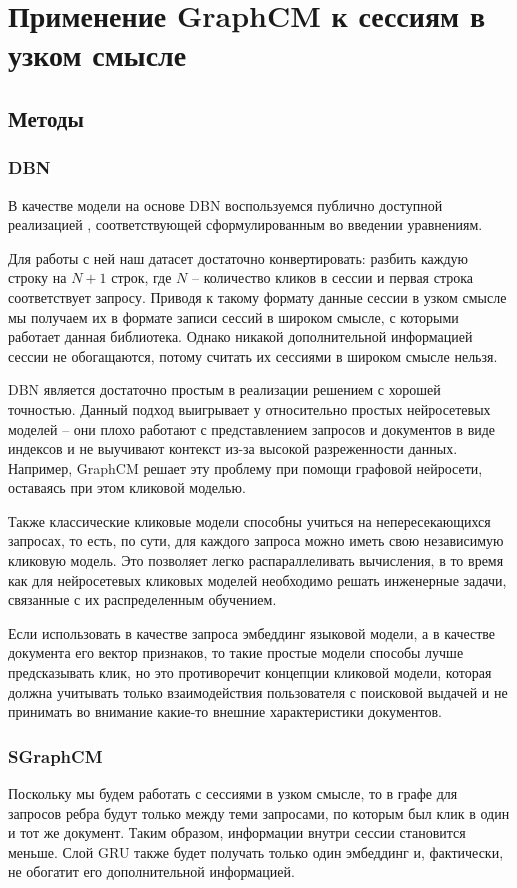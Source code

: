 \documentclass[diploma]{nanolab2015}
\begin{document}
\section{Применение GraphCM к сессиям в узком смысле}
\subsection{Методы}
\subsubsection{DBN}
В качестве модели на основе DBN воспользуемся публично доступной реализацией \cite{dbngithub}, соответствующей сформулированным во введении уравнениям.

Для работы с ней наш датасет достаточно конвертировать: разбить каждую строку на $N+1$ строк, где $N$ -- количество кликов в сессии и первая строка соответствует запросу. Приводя к такому формату данные сессии в узком смысле мы получаем их в формате записи сессий в широком смысле, с которыми работает данная библиотека. Однако никакой дополнительной информацией сессии не обогащаются, потому считать их сессиями в широком смысле нельзя.

DBN является достаточно простым в реализации решением с хорошей точностью. Данный подход выигрывает у относительно простых нейросетевых моделей -- они плохо работают с представлением запросов и документов в виде индексов и не выучивают контекст из-за высокой разреженности данных. Например, GraphCM решает эту проблему при помощи графовой нейросети, оставаясь при этом кликовой моделью.

Также классические кликовые модели способны учиться на непересекающихся запросах, то есть, по сути, для каждого запроса можно иметь свою независимую кликовую модель. Это позволяет легко распараллеливать вычисления, в то время как для нейросетевых кликовых моделей необходимо решать инженерные задачи, связанные с их распределенным обучением.

Если использовать в качестве запроса эмбеддинг языковой модели, а в качестве документа его вектор признаков, то такие простые модели способы лучше предсказывать клик, но это противоречит концепции кликовой модели, которая должна учитывать только взаимодействия пользователя с поисковой выдачей и не принимать во внимание какие-то внешние характеристики документов.

\subsubsection{SGraphCM}
Поскольку мы будем работать с сессиями в узком смысле, то в графе для запросов ребра будут только между теми запросами, по которым был клик в один и тот же документ. Таким образом, информации внутри сессии становится меньше. Слой GRU также будет получать только один эмбеддинг и, фактически, не обогатит его дополнительной информацией.
\end{document}
